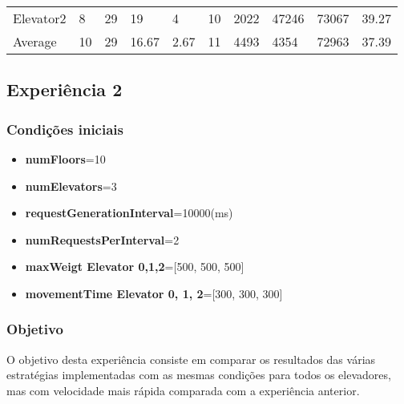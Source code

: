 \documentclass[a4paper]{article}
\begin{document}
\begin{table}[h]
\begin{tabular}{@{}llllllllll@{}}
Elevator2 & 8        & 29            & 19           & 4                                                               & 10                                                                  & 2022                                                         & 47246                                                 & 73067                                                   & 39.27         \\
Average   & 10     & 29         & 16.67        & 2.67                                                               & 11                                                               & 4493                                                         & 4354                                                 & 72963                                                   & 37.39          \\ \bottomrule
\end{tabular}
\end{table}

\subsection{Experiência 2}

\subsubsection{Condições iniciais}

\begin{itemize}
\item \textbf{numFloors}=10
\item \textbf{numElevators}=3
\item \textbf{requestGenerationInterval}=10000(ms)
\item \textbf{numRequestsPerInterval}=2
\item \textbf{maxWeigt Elevator 0,1,2}=[500, 500, 500]
\item \textbf{movementTime Elevator 0, 1, 2}=[300, 300, 300]
\end{itemize}

\subsubsection{Objetivo} 

O objetivo desta experiência consiste em comparar os resultados das várias estratégias implementadas com as mesmas condições para todos os elevadores, mas com velocidade mais rápida comparada com a experiência anterior.
\end{document}

